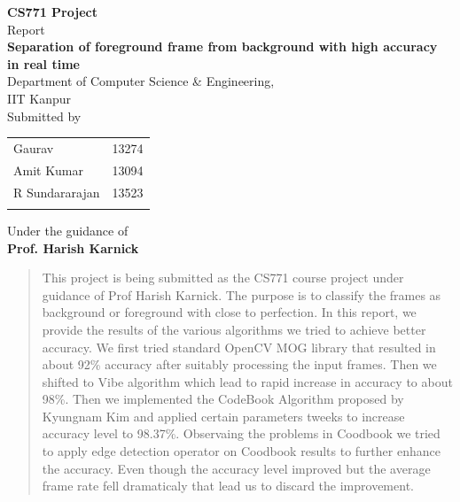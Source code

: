 \documentclass[12pt,a4paper]{article}
\begin{document}

\begin{titlepage}

\begin{center}

\textup{\small {\bf CS771 Project} \\ Report}\\[0.2in]

\Large \textbf {Separation of foreground frame from background with  high
accuracy in real time}\\[0.5in]
{Department of Computer Science \& Engineering, \\IIT Kanpur }\\[0.2in]

\normalsize Submitted by \\
\begin{table}[h]
\centering
\begin{tabular}{lr} 
Gaurav & 13274 \\
Amit Kumar& 13094 \\
R Sundararajan& 13523\\ \\ 
\end{tabular}
\end{table}

\vspace{.1in}
Under the guidance of\\
{\textbf{Prof. Harish Karnick}}\\[0.2in]

\end{center}
\end{titlepage}
\begin{abstract}
This project is being submitted as the CS771 course project under guidance of Prof Harish Karnick. 
The purpose is to classify the frames as background or foreground with close to perfection.
In this report, we provide the results of the various algorithms we tried to achieve better accuracy.
We first tried standard OpenCV MOG library that resulted in about 92\% accuracy after suitably processing the input frames. Then we shifted to Vibe algorithm which lead to rapid increase in accuracy to about 98\%. Then we implemented the CodeBook Algorithm proposed by Kyungnam Kim and applied certain parameters tweeks to increase accuracy level to 98.37\%.
Observaing the problems in Coodbook we tried to apply edge detection operator on Coodbook results to further enhance the accuracy. Even though the accuracy level improved but the average frame rate fell dramaticaly that lead us to discard the improvement. 
\end{abstract} 
\end{document}
